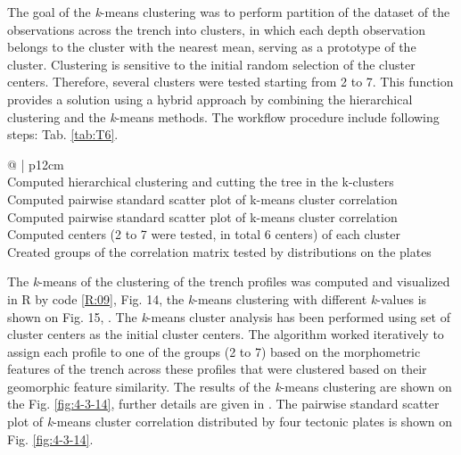 \documentclass[11pt,a4paper]{report}
\newcounter{magicrownumbers}
\newcommand\rownumber{\stepcounter{magicrownumbers}\arabic{magicrownumbers}}
\begin{document}
{The goal of the \emph{k}-means clustering was to perform partition of the dataset of the observations across the trench into clusters, in which each depth observation belongs to the cluster with the nearest mean, serving as a prototype of the cluster. Clustering is sensitive to the initial random selection of the cluster centers. Therefore, several clusters were tested starting from 2 to 7. This function provides a solution using a hybrid approach by combining the hierarchical clustering and the \emph{k}-means methods. The workflow procedure include following steps: Tab. \ref{tab:T6}.

\begin{table}
\caption{Statistical algorithm of clustering, R code: \ref{R:09}}\label{tab:T6}
\begin{tabular}{@{\makebox[1.5em][r]{\rownumber\space}} | p{12cm} }
 \\ 
		\hline\hline				
        Computed hierarchical clustering and cutting the tree in the k-clusters \\              
       		\hline					
        Computed pairwise standard scatter plot of k-means cluster correlation \\           
        		\hline
	Computed pairwise standard scatter plot of k-means cluster correlation \\           
        		\hline
	Computed centers (2 to 7 were tested, in total 6 centers) of each cluster\\  
        		\hline
	Created groups of the correlation matrix tested by distributions on the plates \\           
        		\hline\hline
\end{tabular}
\end{table}

The \emph{k}-means of the clustering of the trench profiles was computed and visualized in R by code \ref{R:09}, Fig. 14, the \emph{k}-means clustering with different \emph{k}-values is shown on Fig. 15, \cite{Lemenkova201991}. The \emph{k}-means cluster analysis has been performed using set of cluster centers as the initial cluster centers. The algorithm worked iteratively to assign each profile to one of the groups (2 to 7) based on the morphometric features of the trench across these profiles that were clustered based on their geomorphic feature similarity. The results of the \emph{k}-means clustering are shown on the Fig. \ref{fig:4-3-14}, further details are given in \cite{Lemenkova201992}. The pairwise standard scatter plot of \emph{k}-means cluster correlation distributed by four tectonic plates is shown on Fig. \ref{fig:4-3-14}. 

}
\end{document}
